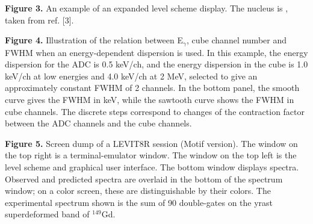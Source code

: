 {\bf Figure 3.} 
An example of an expanded level scheme display. The nucleus is \ho, taken from
ref. [3].
\vspace{5mm}

{\bf Figure 4.} 
Illustration of the relation between E$_{\gamma}$, cube channel number and FWHM
when an energy-dependent dispersion is used. In this example, the energy
dispersion for the ADC is 0.5 keV/ch, and the energy dispersion in the cube is
1.0 keV/ch at low energies and 4.0 keV/ch at 2 MeV, selected to give an
approximately constant FWHM of 2 channels. In the bottom panel, the smooth
curve gives the FWHM in keV, while the sawtooth curve shows the FWHM in cube
channels. The discrete steps correspond to changes of the contraction factor
between the ADC channels and the cube channels.
\vspace{5mm}

{\bf Figure 5.} 
Screen dump of a LEVIT8R session (Motif version).
The window on the top right is a terminal-emulator window. The window on the
top left is the level scheme and graphical user interface. The bottom window
displays spectra.  Observed and predicted spectra are overlaid in the bottom of
the spectrum window; on a color screen, these are distinguishable by their
colors. The experimental spectrum shown is the sum of 90 double-gates on the
yrast superdeformed band of $^{149}$Gd.


